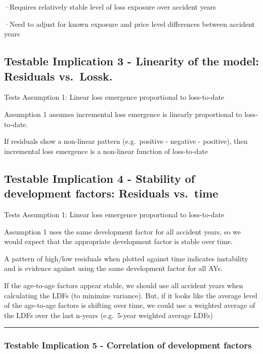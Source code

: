 \documentclass[
]{article}
\begin{document}
·Requires relatively stable level of loss exposure over accident years

·Need to adjust for known exposure and price level differences between
accident years

\subsection{Testable Implication 3 - Linearity of the model: Residuals
vs.~Lossk.}\label{testable-implication-3---linearity-of-the-model-residuals-vs.-lossk.}

Tests Assumption 1: Linear loss emergence proportional to loss-to-date

Assumption 1 assumes incremental loss emergence is linearly proportional
to loss-to-date.

If residuals show a non-linear pattern (e.g.~positive - negative -
positive), then incremental loss emergence is a non-linear function of
loss-to-date

\subsection{Testable Implication 4 - Stability of development factors:
Residuals
vs.~time}\label{testable-implication-4---stability-of-development-factors-residuals-vs.-time}

Tests Assumption 1: Linear loss emergence proportional to loss-to-date

Assumption 1 uses the same development factor for all accident years, so
we would expect that the appropriate development factor is stable over
time.

A pattern of high/low residuals when plotted against time indicates
instability and is evidence against using the same development factor
for all AYs.

If the age-to-age factors appear stable, we should use all accident
years when calculating the LDFs (to minimize variance). But, if it looks
like the average level of the age-to-age factors is shifting over time,
we could use a weighted average of the LDFs over the last n-years
(e.g.~5-year weighted average LDFs)

\begin{center}\rule{0.5\linewidth}{0.5pt}\end{center}

\subsubsection{Testable Implication 5 - Correlation of development
factors}\label{testable-implication-5---correlation-of-development-factors}
\end{document}
